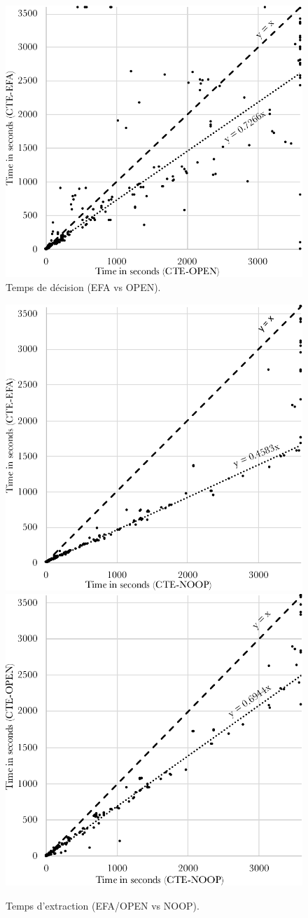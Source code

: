 \begin{figure}[ht!] \centering
\begin{center} \includegraphics[width=.48\textwidth]{figures/time-plansat-efa-open3} \end{center}
\caption{Temps de décision (EFA vs OPEN).}
\label{fig:plansat}
\end{figure}

\begin{figure}[ht!] \centering
\begin{center} \includegraphics[width=.45\textwidth]{figures/time-extract-efa-noop3-good} %
\hfill
\includegraphics[width=.45\textwidth]{figures/time-extract-open-noop3} \end{center}
\caption{Temps d'extraction (EFA/OPEN vs NOOP).}
\label{fig:planextract-noop}
\end{figure}

